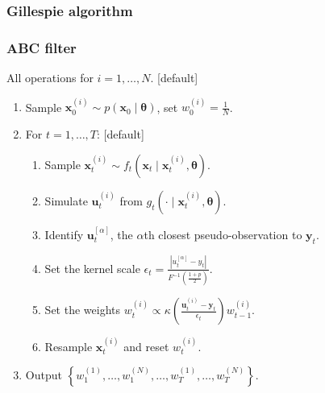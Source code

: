 \documentclass{beamer}
\newcommand{\bx}{\bm{x}}
\newcommand{\by}{\bm{y}}
\newcommand{\bu}{\bm{u}}
\newcommand{\btheta}{\bm{\theta}}
\newcommand{\trans}{f}
\newcommand{\obs}{g}
\newcommand{\sprior}{p}
\begin{document}
    \begin{frame}[noframenumbering]
    \frametitle{Gillespie algorithm}
    \end{frame}

    \begin{frame}[noframenumbering]
    \frametitle{ABC filter}
    All operations for $i = 1, \ldots, N$.
    [default]
    \begin{enumerate}
        \item Sample $\bx_0^{(i)} \sim \sprior(\bx_0 \mid \btheta)$, set $w_0^{(i)} = \frac{1}{N}$.
        \item For $t = 1, \ldots, T$:
        [default]
        \begin{enumerate}
            \item Sample $\bx_t^{(i)} \sim \trans_t(\bx_t \mid \bx_t^{(i)}, \btheta)$.
            \item Simulate $\bu_t^{(i)}$ from $\obs_t(\cdot \mid \bx_t^{(i)}, \btheta)$.
            \item Identify $\bu_t^{[\alpha]}$, the $\alpha$th closest pseudo-observation to $\by_t$.
            \item Set the kernel scale $\epsilon_t = \frac{\left| u_t^{[\alpha]} - y_t \right|}{F^{-1}(\frac{1+p}{2})}$.
            \item Set the weights $w_t^{(i)} \propto \kappa(\frac{\bu_t^{(i)} - \by_t}{\epsilon_t}) w_{t-1}^{(i)}.$
            \item Resample $\bx_t^{(i)}$ and reset $w_t^{(i)}$.
        \end{enumerate}
        \item Output $\left\{w_1^{(1)}, \ldots, w_1^{(N)}, \ldots, w_T^{(1)}, \ldots, w_T^{(N)}\right\}$.
    \end{enumerate}
    \end{frame}
\end{document}
